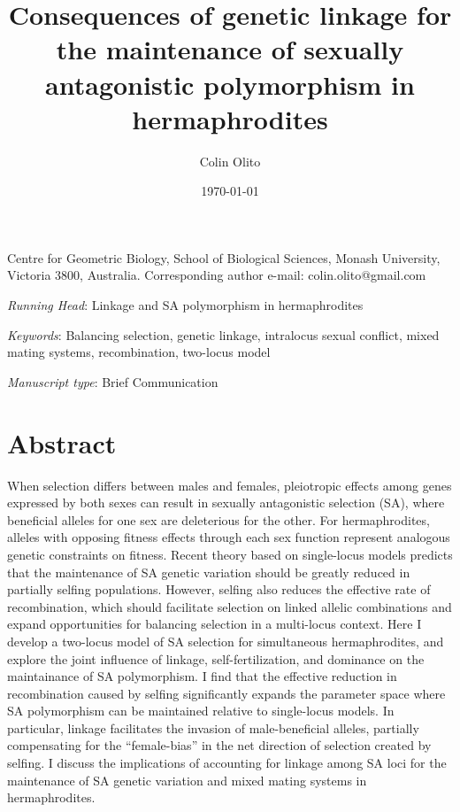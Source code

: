 \documentclass{article}
\title{Consequences of genetic linkage for the maintenance of sexually antagonistic polymorphism in hermaphrodites}
\author{Colin Olito}
\date{\today}
\begin{document}
\maketitle


\noindent{} Centre for Geometric Biology, School of Biological Sciences, Monash University, Victoria 3800, Australia.
\noindent{} Corresponding author e-mail: colin.olito@gmail.com

\bigskip

\noindent{} \textit{Running Head}: Linkage and SA polymorphism in hermaphrodites

\bigskip

\noindent{} \textit{Keywords}: Balancing selection, genetic linkage, intralocus sexual conflict, mixed mating systems, recombination, two-locus model

\bigskip

\noindent{} \textit{Manuscript type}: Brief Communication

\bigskip


\linenumbers
\modulolinenumbers[1]
\renewcommand\linenumberfont{\normalfont\small}


\newpage{}
\section*{Abstract}

\noindent{} When selection differs between males and females, pleiotropic effects among genes expressed by both sexes can result in sexually antagonistic selection (SA), where beneficial alleles for one sex are deleterious for the other. For hermaphrodites, alleles with opposing fitness effects through each sex function represent analogous genetic constraints on fitness. Recent theory based on single-locus models predicts that the maintenance of SA genetic variation should be greatly reduced in partially selfing populations. However, selfing also reduces the effective rate of recombination, which should facilitate selection on linked allelic combinations and expand opportunities for balancing selection in a multi-locus context. Here I develop a two-locus model of SA selection for simultaneous hermaphrodites, and explore the joint influence of linkage, self-fertilization, and dominance on the maintainance of SA polymorphism. I find that the effective reduction in recombination caused by selfing significantly expands the parameter space where SA polymorphism can be maintained relative to single-locus models. In particular, linkage facilitates the invasion of male-beneficial alleles, partially compensating for the ``female-bias'' in the net direction of selection created by selfing. I discuss the implications of accounting for linkage among SA loci for the maintenance of SA genetic variation and mixed mating systems in hermaphrodites.
\end{document}
